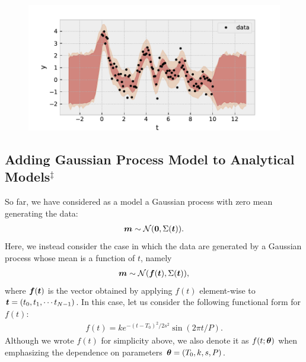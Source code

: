 \begin{figure}[htb]
\begin{center}
\includegraphics[width=\linewidth]{fig/gp/gp6.pdf}
\caption{\label{fig:gp6}}
\end{center}
\end{figure}


\subsection*{Adding Gaussian Process Model to Analytical Models$^\ddagger$}

So far, we have considered as a model a Gaussian process with zero mean generating the data:
\begin{align}
\boldsymbol{m} \sim \mathcal{N} ({\bf 0},\Sigma(\boldsymbol{t})).
\end{align}
Here, we instead consider the case in which the data are generated by a Gaussian process whose mean is a function of $t$, namely
\begin{align}
\label{eq:modelgp}
\boldsymbol{m} \sim \mathcal{N} (\boldsymbol{f}(\boldsymbol{t}),\Sigma(\boldsymbol{t})),
\end{align}
where $\boldsymbol{f}(\boldsymbol{t})$ is the vector obtained by applying $f(t)$ element-wise to $\boldsymbol{t}=(t_0,t_1,\cdots t_{N-1})$. In this case, let us consider the following functional form for $f(t)$:
\begin{align}
f(t) = k e^{-(t-T_0)^2/2 s^2} \sin{(2 \pi t/P)}.
\end{align}
Although we wrote $f(t)$ for simplicity above, we also denote it as $f(t;\boldsymbol{\theta})$ when emphasizing the dependence on parameters $\boldsymbol{\theta}=(T_0,k,s,P)$.

